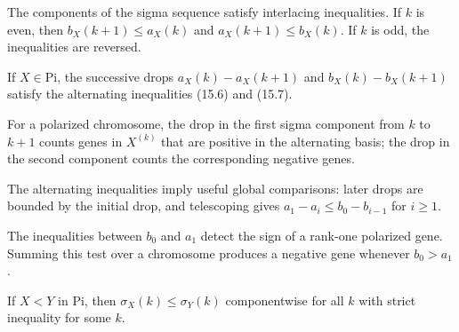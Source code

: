 \begin{lemma}
  \label{lem:Sigma.interlacing}
  \leanok
  The components of the sigma sequence satisfy interlacing inequalities.
  If $k$ is even, then $b_X(k+1) \le a_X(k)$ and $a_X(k+1) \le b_X(k)$.
  If $k$ is odd, the inequalities are reversed.
\end{lemma}

\begin{lemma}
  \label{lem:Sigma.cond_15_6}
  \leanok
  If $X \in \mathrm{Pi}$, the successive drops
  $a_X(k)-a_X(k+1)$ and $b_X(k)-b_X(k+1)$ satisfy the alternating
  inequalities (15.6) and (15.7).
\end{lemma}

\begin{lemma}
  \label{lem:Sigma.sigma_diff}
  \leanok
  For a polarized chromosome, the drop in the first sigma component from
  $k$ to $k+1$ counts genes in $X^{(k)}$ that are positive in the alternating
  basis; the drop in the second component counts the corresponding negative
  genes.
\end{lemma}

\begin{lemma}
  \label{lem:Sigma.compare_drops}
  \leanok
  The alternating inequalities imply useful global comparisons: later drops
  are bounded by the initial drop, and telescoping gives
  $a_1-a_i \le b_0-b_{i-1}$ for $i\ge 1$.
\end{lemma}

\begin{lemma}
  \label{lem:Sigma.case_sign_tests}
  \leanok
  The inequalities between $b_0$ and $a_1$ detect the sign of a rank-one
  polarized gene.  Summing this test over a chromosome produces a negative
  gene whenever $b_0>a_1$.
\end{lemma}

\begin{lemma}
  \label{lem:Sigma.cond_15_8}
  \leanok
  If $X < Y$ in $\mathrm{Pi}$, then $\sigma_X(k) \le \sigma_Y(k)$ componentwise for all $k$
  with strict inequality for some $k$.
\end{lemma}
